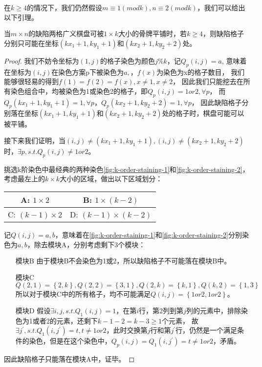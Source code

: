 在$k \ge 4$的情况下，我们仍然假设$m \equiv 1 (mod k), n \equiv 2 (mod k)$，我们可以给出以下引理。
\begin{theorem}
	\label{basic-theorem-3}
	当$m \times n$的缺陷两格广义棋盘可被$1 \times k$大小的骨牌平铺时，若$k \ge 4$，则缺陷格子分别只可能在坐标$(kx_1 + 1, ky_1 + 1)$和$(kx_2 + 1, ky_2 + 2)$处。
\end{theorem}
\begin{proof}
	我们不妨令坐标为$(1, j)$的格子染色为颜色$j \% k$，记$Q_p(i, j) = a$, 意味着在坐标为$(i, j)$在染色方案p下被染色为$a,$，$f(x)$为染色为x的格子数目，
	我们能够很轻易的得到$f(1) = f(2) = f(x), x \neq 1, x \neq 2$，
	因此我们只能挖去在所有染色组合中，均被染色为1或染色2的格子，即$Q_p(i, j) = 1 or 2, \forall p$，
	而$Q_p(kx_1 + 1, ky_1 + 1) = 1, \forall p$，$Q_p(kx_2 + 1, ky_2 + 2) = 1, \forall p$，
	因此缺陷格子分别落在坐标$(kx_1 + 1, ky_1 + 1)$和$(kx_2 + 1, ky_2 + 2)$处的格子时，棋盘可能可以被平铺。

	接下来我们证明，当$(i, j) \neq (kx_1 + 1, ky_1 + 1), (i, j) \neq (kx_2 + 1, ky_2 + 2)$时，$\exists p, s.t. Q_p(i, j) \neq 1 or 2$。

	挑选k阶染色中最经典的两种染色\ref{fig:k-order-staining-1}和\ref{fig:k-order-staining-2}，考虑最左上的$k \times k$大小的区域，做出以下区域划分：

	\begin{table}[ht]
		\centering
		\begin{tabular}{|c|c|}
			\hline
			A: $1 \times 2$       & B: $1  \times (k - 2)$     \\
			\hline
			C: $(k - 1) \times 2$ & D: $(k - 1)\times (k - 2)$ \\
			\hline
		\end{tabular}
	\end{table}

	记$Q(i, j) = {a, b}$，意味着在\ref{fig:k-order-staining-1}和\ref{fig:k-order-staining-2}分别染色为$a, b$，除去模块A，分别考虑剩下3个模块：
	\begin{itemize}
		\item[模块B] 由于模块B不会染色为1或2，所以缺陷格子不可能落在模块B中。
		\item[模块C] $Q(2, 1) = \left\{2, k\right\}, Q(2, 2) = \left\{3, 1\right\}, Q(2, k) = \left\{k, 1\right\}, Q(k,2) = \left\{1, 3\right\}$
			所以对于模块C中的所有格子，均不可能满足$Q(i, j) = \left\{1 or 2, 1 or 2\right\}$。
		\item[模块D] 假设$\exists i, j, s.t. Q_1(i, j) = 1$，在第$i$行，第$2$列到第$j$列的元素中，排除染色为1或者2的元素，还剩下$k - 1 - 2 = k - 3\ge 1$个元素，
			故$\exists j^{'}, s.t. Q_1(i, j^{'}) = t, t \neq 1 or 2$，此时交换第$j$行和第$j^{'}$行，仍然是一个满足条件的染色，但是在这个染色中，$Q_p(i, j) = Q_1(i, j^{'}) = t \neq 1 or 2$，矛盾。
	\end{itemize}
	因此缺陷格子只能落在模块A中，证毕。
\end{proof}

